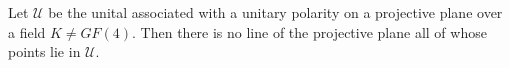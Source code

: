 Let $\mathcal{U}$ be the unital associated with a unitary polarity on a projective plane over a field $K \neq GF(4)$. Then there is no line of the projective plane all of whose points lie in $\mathcal{U}$.
